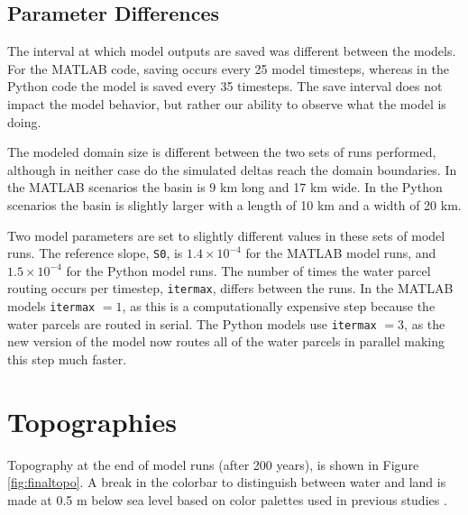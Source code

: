 \subsection{Parameter Differences}
The interval at which model outputs are saved was different between the models. For the MATLAB code, saving occurs every 25 model timesteps, whereas in the Python code the model is saved every 35 timesteps.
The save interval does not impact the model behavior, but rather our ability to observe what the model is doing.

The modeled domain size is different between the two sets of runs performed, although in neither case do the simulated deltas reach the domain boundaries.
In the MATLAB scenarios the basin is 9 km long and 17 km wide.
In the Python scenarios the basin is slightly larger with a length of 10 km and a width of 20 km.

Two model parameters are set to slightly different values in these sets of model runs.
The reference slope, \texttt{S0}, is $1.4 \times 10^{-4}$ for the MATLAB model runs, and $1.5 \times 10^{-4}$ for the Python model runs.
The number of times the water parcel routing occurs per timestep, \texttt{itermax}, differs between the runs.
In the MATLAB models \texttt{itermax} $=1$, as this is a computationally expensive step because the water parcels are routed in serial.
The Python models use \texttt{itermax} $=3$, as the new version of the model now routes all of the water parcels in parallel making this step much faster. 

\section{Topographies}
Topography at the end of model runs (after 200 years), is shown in Figure \ref{fig:finaltopo}.
A break in the colorbar to distinguish between water and land is made at 0.5 m below sea level based on color palettes used in previous studies \cite{Liang2016a, Liang2016}.

